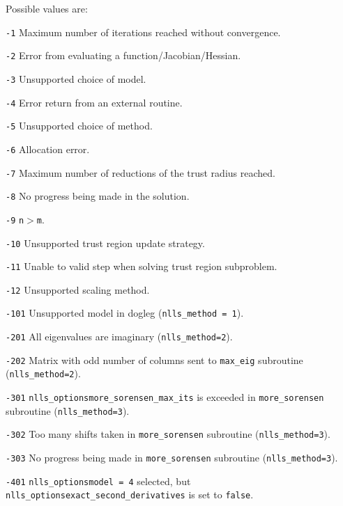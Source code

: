 
Possible values are:
\begin{description}
\item{} {\tt -1} Maximum number of iterations reached without convergence.
\item{} {\tt -2} Error from evaluating a function/Jacobian/Hessian.
\item{} {\tt -3} Unsupported choice of model.
\item{} {\tt -4} Error return from an external routine.
\item{} {\tt -5} Unsupported choice of method.
\item{} {\tt -6} Allocation error.
\item{} {\tt -7} Maximum number of reductions of the trust radius reached.
\item{} {\tt -8} No progress being made in the solution.
\item{} {\tt -9} \texttt{n}$>$\texttt{m}.
\item{} {\tt -10} Unsupported trust region update strategy.
\item{} {\tt -11} Unable to valid step when solving trust region subproblem.
\item{} {\tt -12} Unsupported scaling method.
\item{} {\tt -101} Unsupported model in dogleg (\texttt{nlls\_method = 1}).
\item{} {\tt -201}  All eigenvalues are imaginary (\texttt{nlls\_method=2}).
\item{} {\tt -202} Matrix with odd number of columns sent to \texttt{max\_eig} subroutine (\texttt{nlls\_method=2}).
\item{} {\tt -301} {\tt nlls\_options\ct more\_sorensen\_max\_its} is exceeded in \texttt{more\_sorensen} subroutine (\texttt{nlls\_method=3}).
\item{} {\tt -302} Too many shifts taken in \texttt{more\_sorensen} subroutine (\texttt{nlls\_method=3}).
\item{} {\tt -303} No progress being made in \texttt{more\_sorensen} subroutine (\texttt{nlls\_method=3}).
\item{} {\tt -401} {\tt nlls\_options\ct model = 4} selected, but {\tt nlls\_options\ct exact\_second\_derivatives} is set to {\tt false}.
\end{description}
